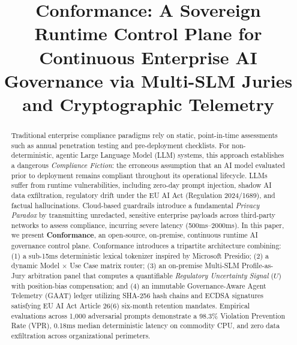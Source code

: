 \documentclass[conference,10pt]{IEEEtran}
\begin{document}
\title{Conformance: A Sovereign Runtime Control Plane for Continuous Enterprise AI Governance via Multi-SLM Juries and Cryptographic Telemetry}

\author{
}

\maketitle

\begin{abstract}
Traditional enterprise compliance paradigms rely on static, point-in-time assessments such as annual penetration testing and pre-deployment checklists. For non-deterministic, agentic Large Language Model (LLM) systems, this approach establishes a dangerous \textit{Compliance Fiction}: the erroneous assumption that an AI model evaluated prior to deployment remains compliant throughout its operational lifecycle. LLMs suffer from runtime vulnerabilities, including zero-day prompt injection, shadow AI data exfiltration, regulatory drift under the EU AI Act (Regulation 2024/1689), and factual hallucinations. Cloud-based guardrails introduce a fundamental \textit{Privacy Paradox} by transmitting unredacted, sensitive enterprise payloads across third-party networks to assess compliance, incurring severe latency (500ms--2000ms). In this paper, we present \textbf{Conformance}, an open-source, on-premise, continuous runtime AI governance control plane. Conformance introduces a tripartite architecture combining: (1) a sub-15ms deterministic lexical tokenizer inspired by Microsoft Presidio; (2) a dynamic Model $\times$ Use Case matrix router; (3) an on-premise Multi-SLM Profile-as-Jury arbitration panel that computes a quantifiable \textit{Regulatory Uncertainty Signal} ($U$) with position-bias compensation; and (4) an immutable Governance-Aware Agent Telemetry (GAAT) ledger utilizing SHA-256 hash chains and ECDSA signatures satisfying EU AI Act Article 26(6) six-month retention mandates. Empirical evaluations across 1,000 adversarial prompts demonstrate a 98.3\% Violation Prevention Rate (VPR), 0.18ms median deterministic latency on commodity CPU, and zero data exfiltration across organizational perimeters.
\end{abstract}
\end{document}
